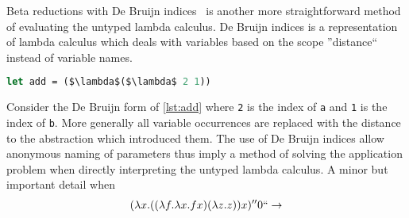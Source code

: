\documentclass[11pt,oneside,a4paper]{report}
\begin{document}
Beta reductions with De Bruijn indices~\cite{de1972lambda} is another more straightforward method of evaluating the untyped lambda calculus.
De Bruijn indices is a representation of lambda calculus which deals with variables based on the scope ''distance`` instead of variable names.
\begin{lstlisting}[language=ML,caption={Add as De Bruijn},label={lst:adddebru},mathescape=true]
let add = ($\lambda$($\lambda$ 2 1))
\end{lstlisting}
Consider the De Bruijn form of \autoref{lst:add} where \texttt{2} is the index of \texttt{a} and \texttt{1} is the index of \texttt{b}.
More generally all variable occurrences are replaced with the distance to the abstraction which introduced them.
The use of De Bruijn indices allow anonymous naming of parameters thus imply a method of solving the application problem when directly interpreting the untyped lambda calculus.
A minor but important detail when 
\begin{align}
    &(\lambda x . ((\lambda f. \lambda x. f x)(\lambda z . z))x)''0`` \rightarrow\\
    &
\end{align}
\end{document}
